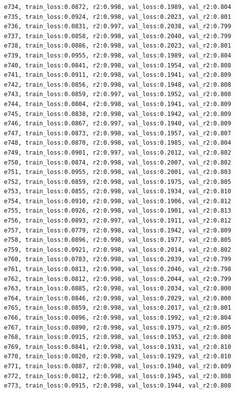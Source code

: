 \documentclass[a4paper, 12pt]{article}
\begin{document}
\begin{lstlisting}
e734, train_loss:0.0872, r2:0.998, val_loss:0.1989, val_r2:0.804
e735, train_loss:0.0924, r2:0.998, val_loss:0.2023, val_r2:0.801
e736, train_loss:0.0831, r2:0.997, val_loss:0.2038, val_r2:0.799
e737, train_loss:0.0858, r2:0.998, val_loss:0.2040, val_r2:0.799
e738, train_loss:0.0886, r2:0.998, val_loss:0.2023, val_r2:0.801
e739, train_loss:0.0955, r2:0.998, val_loss:0.1989, val_r2:0.804
e740, train_loss:0.0841, r2:0.998, val_loss:0.1954, val_r2:0.808
e741, train_loss:0.0911, r2:0.998, val_loss:0.1941, val_r2:0.809
e742, train_loss:0.0856, r2:0.998, val_loss:0.1948, val_r2:0.808
e743, train_loss:0.0859, r2:0.997, val_loss:0.1952, val_r2:0.808
e744, train_loss:0.0804, r2:0.998, val_loss:0.1941, val_r2:0.809
e745, train_loss:0.0838, r2:0.998, val_loss:0.1942, val_r2:0.809
e746, train_loss:0.0867, r2:0.997, val_loss:0.1940, val_r2:0.809
e747, train_loss:0.0873, r2:0.998, val_loss:0.1957, val_r2:0.807
e748, train_loss:0.0870, r2:0.998, val_loss:0.1985, val_r2:0.804
e749, train_loss:0.0901, r2:0.997, val_loss:0.2012, val_r2:0.802
e750, train_loss:0.0874, r2:0.998, val_loss:0.2007, val_r2:0.802
e751, train_loss:0.0955, r2:0.998, val_loss:0.2001, val_r2:0.803
e752, train_loss:0.0859, r2:0.998, val_loss:0.1975, val_r2:0.805
e753, train_loss:0.0855, r2:0.998, val_loss:0.1934, val_r2:0.810
e754, train_loss:0.0910, r2:0.998, val_loss:0.1906, val_r2:0.812
e755, train_loss:0.0926, r2:0.998, val_loss:0.1901, val_r2:0.813
e756, train_loss:0.0893, r2:0.997, val_loss:0.1911, val_r2:0.812
e757, train_loss:0.0779, r2:0.998, val_loss:0.1942, val_r2:0.809
e758, train_loss:0.0896, r2:0.998, val_loss:0.1977, val_r2:0.805
e759, train_loss:0.0921, r2:0.998, val_loss:0.2014, val_r2:0.802
e760, train_loss:0.0783, r2:0.998, val_loss:0.2039, val_r2:0.799
e761, train_loss:0.0813, r2:0.998, val_loss:0.2046, val_r2:0.798
e762, train_loss:0.0812, r2:0.998, val_loss:0.2044, val_r2:0.799
e763, train_loss:0.0885, r2:0.998, val_loss:0.2034, val_r2:0.800
e764, train_loss:0.0846, r2:0.998, val_loss:0.2029, val_r2:0.800
e765, train_loss:0.0859, r2:0.998, val_loss:0.2017, val_r2:0.801
e766, train_loss:0.0896, r2:0.998, val_loss:0.1992, val_r2:0.804
e767, train_loss:0.0890, r2:0.998, val_loss:0.1975, val_r2:0.805
e768, train_loss:0.0915, r2:0.998, val_loss:0.1953, val_r2:0.808
e769, train_loss:0.0841, r2:0.998, val_loss:0.1931, val_r2:0.810
e770, train_loss:0.0820, r2:0.998, val_loss:0.1929, val_r2:0.810
e771, train_loss:0.0887, r2:0.998, val_loss:0.1940, val_r2:0.809
e772, train_loss:0.0812, r2:0.998, val_loss:0.1945, val_r2:0.808
e773, train_loss:0.0915, r2:0.998, val_loss:0.1944, val_r2:0.808

\end{lstlisting}
\end{document}
